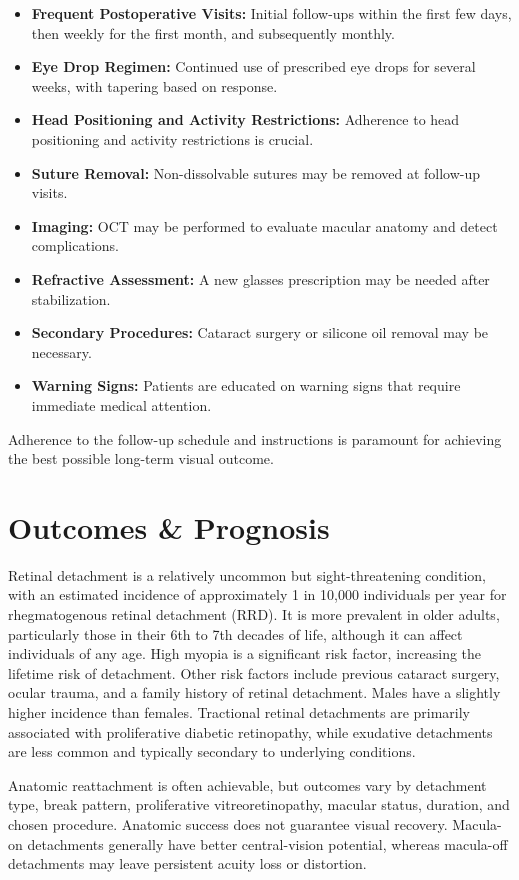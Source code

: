 \begin{itemize}
  \item \textbf{Frequent Postoperative Visits:} Initial follow-ups within the first few days, then weekly for the first month, and subsequently monthly.
  \item \textbf{Eye Drop Regimen:} Continued use of prescribed eye drops for several weeks, with tapering based on response.
  \item \textbf{Head Positioning and Activity Restrictions:} Adherence to head positioning and activity restrictions is crucial.
  \item \textbf{Suture Removal:} Non-dissolvable sutures may be removed at follow-up visits.
  \item \textbf{Imaging:} OCT may be performed to evaluate macular anatomy and detect complications.
  \item \textbf{Refractive Assessment:} A new glasses prescription may be needed after stabilization.
  \item \textbf{Secondary Procedures:} Cataract surgery or silicone oil removal may be necessary.
  \item \textbf{Warning Signs:} Patients are educated on warning signs that require immediate medical attention.
\end{itemize}

Adherence to the follow-up schedule and instructions is paramount for achieving the best possible long-term visual outcome.

\section*{Outcomes \& Prognosis}
Retinal detachment is a relatively uncommon but sight-threatening condition, with an estimated incidence of approximately 1 in 10,000 individuals per year for rhegmatogenous retinal detachment (RRD). It is more prevalent in older adults, particularly those in their 6th to 7th decades of life, although it can affect individuals of any age. High myopia is a significant risk factor, increasing the lifetime risk of detachment. Other risk factors include previous cataract surgery, ocular trauma, and a family history of retinal detachment. Males have a slightly higher incidence than females. Tractional retinal detachments are primarily associated with proliferative diabetic retinopathy, while exudative detachments are less common and typically secondary to underlying conditions.

Anatomic reattachment is often achievable, but outcomes vary by detachment type, break pattern, proliferative vitreoretinopathy, macular status, duration, and chosen procedure. Anatomic success does not guarantee visual recovery. Macula-on detachments generally have better central-vision potential, whereas macula-off detachments may leave persistent acuity loss or distortion.

